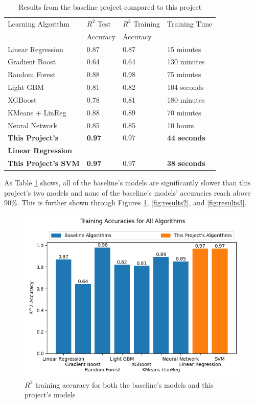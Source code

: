 \documentclass[compsoc]{IEEEtran}
\begin{document}
\begin{table}[h]
\centering
\caption{Results from the baseline project compared to this project}
\begin{tabular}{|l|l|l|l|}
\hline
Learning Algorithm & $R^2$ Test & $R^2$ Training & Training Time \\ 
    & Accuracy    & Accuracy &           \\ \hline
Linear Regression & 0.87 & 0.87 & 15 minutes \\ \hline
Gradient Boost & 0.64 & 0.64 & 130 minutes \\ \hline
Random Forest & 0.88 & 0.98 & 75 minutes \\ \hline
Light GBM & 0.81 & 0.82 & 104 seconds \\ \hline
XGBoost & 0.78 & 0.81 & 180 minutes \\ \hline
KMeans + LinReg & 0.88 & 0.89 & 70 minutes \\ \hline
Neural Network & 0.85 & 0.85 & 10 hours \\ \hline
\textbf{This Project's} & \textbf{0.97} & 0.97 & \textbf{44 seconds} \\ 
\textbf{Linear Regression} & & & \\ \hline
\textbf{This Project's SVM} & \textbf{0.97} & 0.97 & \textbf{38 seconds} \\ \hline
\end{tabular}
\label{table:baseline_results}
\end{table}

As Table \ref{table:baseline_results} shows, all of the baseline's models are significantly slower than this project's two models and none of the baseline's models' accuracies reach above 90\%. This is further shown through Figures \ref{fig:results1}, \ref{fig:results2}, and \ref{fig:results3}.

\begin{figure}[h]
    \centering
    \includegraphics[width=.48\textwidth]{images/results1.png}
    \caption{$R^2$ training accuracy for both the baseline's models and this project's models}
    \label{fig:results1}
\end{figure}
\end{document}

